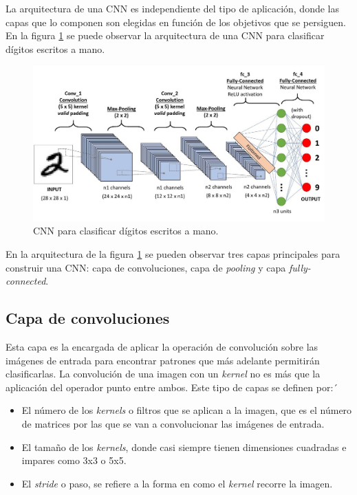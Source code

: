 La arquitectura de una CNN es independiente del tipo de aplicación, donde las capas que lo componen son elegidas en función de los objetivos que se persiguen. En la figura \ref{fig:cnn_arch} se puede observar la arquitectura de una CNN para clasificar dígitos escritos a mano.

\begin{figure}[h]
	\centering
	\includegraphics[scale=0.35]{./Figures/cnn_arch.jpeg}
	\caption{CNN para clasificar dígitos escritos a mano.}
	\label{fig:cnn_arch}
\end{figure}

En la arquitectura de la figura \ref{fig:cnn_arch} se pueden observar tres capas principales para construir una CNN: capa de convoluciones, capa de \textit{pooling} y capa \textit{fully-connected}.

\subsection{Capa de convoluciones}
Esta capa es la encargada de aplicar la operación de convolución sobre las imágenes de entrada para encontrar patrones que más adelante permitirán clasificarlas. La convolución de una imagen con un \textit{kernel} no es más que la aplicación del operador punto entre ambos. Este tipo de capas se definen por:´
\begin{itemize}
	\item El número de los \textit{kernels} o filtros que se aplican a la imagen, que es el número de matrices por las que se van a convolucionar las imágenes de entrada.
	\item El tamaño de los \textit{kernels}, donde casi siempre tienen dimensiones cuadradas e impares como 3x3 o 5x5.
	\item El \textit{stride} o paso, se refiere a la forma en como el \textit{kernel} recorre la imagen.
\end{itemize}

